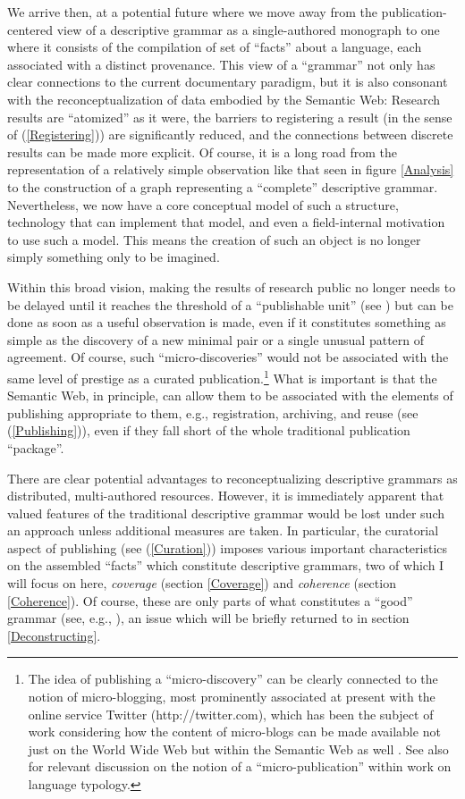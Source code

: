 \documentclass[12pt]{article}
\newcommand{\pref}[1]{(\ref{#1})}
\newcommand{\sref}[1]{section \ref{#1}}
\newcommand{\fref}[1]{figure \ref{#1}}
\newcommand\namecite{\citet}
\renewcommand\cite{\citep}
\begin{document}
We arrive then, at a potential future where we move away from the
publication-centered view of a descriptive grammar as a single-authored
monograph to one where it consists of the compilation of set of ``facts'' about
a language, each associated with a distinct provenance. This view of a
``grammar'' not only has clear connections to the current documentary paradigm,
but it is also consonant with the reconceptualization of data embodied by the
Semantic Web: Research results are ``atomized'' as it were, the barriers to
registering a result (in the sense of \pref{Registering}) are significantly
reduced, and the connections between discrete results can be made more explicit.
Of course, it is a long road from the representation of a relatively simple
observation like that seen in \fref{Analysis} to the construction of a graph
representing a ``complete'' descriptive grammar. Nevertheless, we now have a
core conceptual model of such a structure, technology that can implement that
model, and even a field-internal motivation to use such a model. This
means the creation of such an object is no longer simply something only
to be imagined.

Within this broad vision, making the results of research public no longer needs
to be delayed until it reaches the threshold of a ``publishable unit'' (see
\namecite{Broad:1981}) but can be done as soon as a useful observation is made,
even if it constitutes something as simple as the discovery of a new minimal
pair or a single unusual pattern of agreement. Of course, such
``micro-discoveries'' would not be associated with the same level of prestige as
a curated publication.{\footnote{The idea of publishing a ``micro-discovery''
can be clearly connected to the notion of micro-blogging, most prominently
associated at present with the online service Twitter (http://twitter.com),
which has been the subject of work considering how the content of micro-blogs
can be made available not just on the World Wide Web but within the Semantic Web
as well \cite{PassantEtAl:2010}. See also \namecite[64]{Cysouw:2007:Social} for
relevant discussion on the notion of a ``micro-publication'' within work on
language typology.}} What is important is that the Semantic Web, in principle,
can allow them to be associated with the elements of publishing appropriate to
them, e.g., registration, archiving, and reuse (see \pref{Publishing}), even if
they fall short of the whole traditional publication ``package''.

There are clear potential advantages to reconceptualizing descriptive grammars
as distributed, multi-authored resources. However, it is immediately apparent
that valued features of the traditional descriptive grammar would be lost under
such an approach unless additional measures are taken. In particular, the
curatorial aspect of publishing (see \pref{Curation}) imposes various important
characteristics on the assembled ``facts'' which constitute descriptive
grammars, two of which I will focus on here, \emph{coverage} (\sref{Coverage})
and \emph{coherence} (\sref{Coherence}). Of course, these are only parts of what
constitutes a ``good'' grammar (see, e.g.,
\namecite{Noonan:2006,Rice:2006:Grammars}), an issue which will be briefly
returned to in \sref{Deconstructing}.
\end{document}

